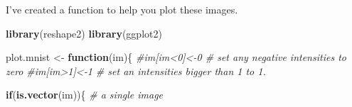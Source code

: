 \documentclass[
]{book}
\newenvironment{Shaded}{\begin{snugshade}}{\end{snugshade}}
\newcommand{\CommentTok}[1]{\textcolor[rgb]{0.56,0.35,0.01}{\textit{#1}}}
\newcommand{\ControlFlowTok}[1]{\textcolor[rgb]{0.13,0.29,0.53}{\textbf{#1}}}
\newcommand{\DecValTok}[1]{\textcolor[rgb]{0.00,0.00,0.81}{#1}}
\newcommand{\FunctionTok}[1]{\textcolor[rgb]{0.13,0.29,0.53}{\textbf{#1}}}
\newcommand{\NormalTok}[1]{#1}
\newcommand{\OtherTok}[1]{\textcolor[rgb]{0.56,0.35,0.01}{#1}}
\newcommand{\SpecialCharTok}[1]{\textcolor[rgb]{0.81,0.36,0.00}{\textbf{#1}}}
\theoremstyle{definition}
\theoremstyle{definition}
\theoremstyle{definition}
\theoremstyle{definition}
\theoremstyle{remark}
\begin{document}
\begin{Shaded}
\end{Shaded}

I've created a function to help you plot these images.

\begin{Shaded}
\begin{Highlighting}[]
\FunctionTok{library}\NormalTok{(reshape2)}
\FunctionTok{library}\NormalTok{(ggplot2)}


\NormalTok{plot.mnist }\OtherTok{\textless{}{-}} \ControlFlowTok{function}\NormalTok{(im)\{}
  \CommentTok{\#im[im\textless{}0]\textless{}{-}0 \# set any negative intensities to zero}
  \CommentTok{\#im[im\textgreater{}1]\textless{}{-}1 \# set an intensities bigger than 1 to 1.}
  
  
  \ControlFlowTok{if}\NormalTok{(}\FunctionTok{is.vector}\NormalTok{(im))\{ }\CommentTok{\# a single image}
    

\end{Highlighting}
\end{Shaded}
\end{document}
